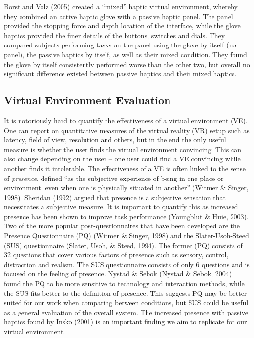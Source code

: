 Borst and Volz (2005) created a ``mixed'' haptic virtual environment, whereby they combined an active haptic glove with a passive haptic panel. The panel provided the stopping force and depth location of the interface, while the glove haptics provided the finer details of the buttons, switches and dials. They compared subjects performing tasks on the panel using the glove by itself (no panel), the passive haptics by itself, as well as their mixed condition. They found the glove by itself consistently performed worse than the other two, but overall no significant difference existed between passive haptics and their mixed haptics.

\subsection{Virtual Environment Evaluation}
\label{virtual-environment-evaluation}

It is notoriously hard to quantify the effectiveness of a virtual environment (VE). One can report on quantitative measures of the virtual reality (VR) setup such as latency, field of view, resolution and others, but in the end the only useful measure is whether the user finds the virtual environment convincing. This can also change depending on the user -- one user could find a VE convincing while another finds it intolerable. The effectiveness of a VE is often linked to the sense of \emph{presence}, defined ``as the subjective experience of being in one place or environment, even when one is physically situated in another'' (Witmer \& Singer, 1998). Sheridan (1992) argued that presence is a subjective sensation that necessitates a subjective measure. It is important to quantify this as increased presence has been shown to improve task performance (Youngblut \& Huie, 2003). Two of the more popular post-questionnaires that have been developed are the Presence Questionnaire (PQ) (Witmer \& Singer, 1998) and the Slater-Usoh-Steed (SUS) questionnaire (Slater, Usoh, \& Steed, 1994). The former (PQ) consists of 32 questions that cover various factors of presence such as sensory, control, distraction and realism. The SUS questionnaire consists of only 6 questions and is focused on the feeling of presence.  Nystad \& Sebok (Nystad \& Sebok, 2004) found the PQ to be more sensitive to technology and interaction methods, while the SUS fits better to the definition of presence. This suggests PQ may be better suited for our work when comparing between conditions, but SUS could be useful as a general evaluation of the overall system. The increased presence with passive haptics found by Insko (2001) is an important finding we aim to replicate for our virtual environment.

